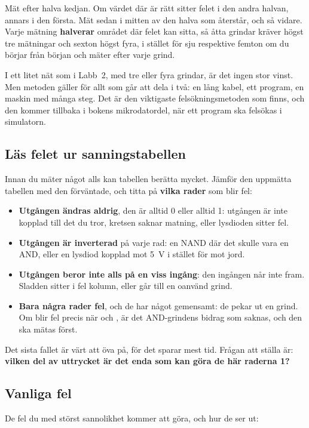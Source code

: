 
Mät efter halva kedjan. Om värdet där är rätt sitter felet i den andra halvan, annars i den
första. Mät sedan i mitten av den halva som återstår, och så vidare. Varje mätning
\textbf{halverar} området där felet kan sitta, så åtta grindar kräver högst tre mätningar och
sexton högst fyra, i stället för sju respektive femton om du börjar från början och mäter efter
varje grind.

I ett litet nät som i Labb~2, med tre eller fyra grindar, är det ingen stor vinst. Men metoden
gäller för allt som går att dela i två: en lång kabel, ett program, en maskin med många steg. Det
är den viktigaste felsökningsmetoden som finns, och den kommer tillbaka i bokens mikrodatordel, när
ett program ska felsökas i simulatorn.

\subsection{Läs felet ur sanningstabellen}
\label{c5:a6}
Innan du mäter något alls kan tabellen berätta mycket. Jämför den uppmätta tabellen med den
förväntade, och titta på \textbf{vilka rader} som blir fel:
\begin{itemize}
  \item \textbf{Utgången ändras aldrig}, den är alltid 0 eller alltid 1: utgången är inte kopplad
    till det du tror, kretsen saknar matning, eller lysdioden sitter fel.
  \item \textbf{Utgången är inverterad} på varje rad: en NAND där det skulle vara en AND, eller en
    lysdiod kopplad mot 5~V i stället för mot jord.
  \item \textbf{Utgången beror inte alls på en viss ingång}: den ingången når inte fram. Sladden
    sitter i fel kolumn, eller går till en oanvänd grind.
  \item \textbf{Bara några rader fel}, och de har något gemensamt: de pekar ut en grind. Om
     blir fel precis när  och , är det AND-grindens
    bidrag som saknas, och den ska mätas först.
\end{itemize}

Det sista fallet är värt att öva på, för det sparar mest tid. Frågan att ställa är:
\textbf{vilken del av uttrycket är det enda som kan göra de här raderna 1?}

\subsection{Vanliga fel}
\label{c5:a7}
De fel du med störst sannolikhet kommer att göra, och hur de ser ut:


